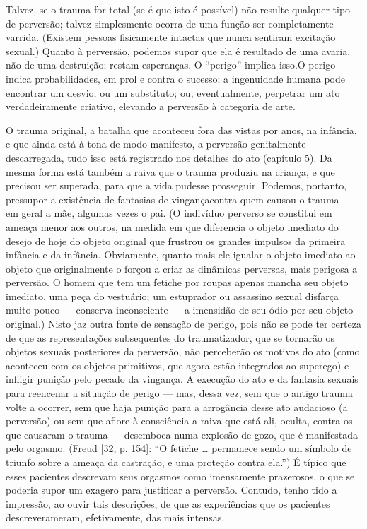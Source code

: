 Talvez, se o trauma for total (se é que isto é possível) não resulte
qualquer tipo de perversão; talvez simplesmente ocorra de uma função
ser completamente varrida. (Existem pessoas fisicamente intactas que
nunca sentiram excitação sexual.) Quanto à perversão, podemos supor que
ela é resultado de uma avaria, não de uma destruição; restam
esperanças. O ``perigo'' implica isso.\idxinfanperig[|)] O
perigo indica probabilidades, em prol e contra o sucesso; a ingenuidade
humana pode encontrar um desvio, ou um substituto; ou, eventualmente,
perpetrar um ato verdadeiramente criativo,\idxcria{} elevando a perversão à
categoria de arte.

O trauma original, a batalha que aconteceu fora das vistas por anos,
na infância, e que ainda está à tona de modo manifesto, a perversão
genitalmente descarregada, tudo isso está registrado nos detalhes do
ato (capítulo 5). Da mesma forma está também a raiva que o trauma
produziu na criança, e que precisou ser superada, para que a vida
pudesse prosseguir. Podemos, portanto, pressupor a existência de
fantasias de vingança\idxvinga[|(] contra quem causou o trauma --- em geral a mãe,
algumas vezes o pai. (O indivíduo perverso se constitui em ameaça menor
aos outros, na medida em que diferencia o objeto imediato do desejo de
hoje do objeto original que frustrou os grandes impulsos da
primeira infância e da infância. Obviamente, quanto mais ele igualar o
objeto imediato ao objeto que originalmente o forçou a criar as
dinâmicas perversas, mais perigosa a perversão. O homem que tem um
fetiche\idxfetic{} por roupas apenas mancha seu objeto imediato, uma peça do
vestuário; um estuprador\idxestup{} ou assassino\idxassas{} sexual disfarça muito pouco ---
conserva inconsciente --- a imensidão de seu ódio por seu objeto
original.) Nisto jaz outra fonte de sensação de perigo, pois não se
pode ter certeza de que as representações subsequentes do
traumatizador, que se tornarão os objetos sexuais posteriores da
perversão, não perceberão os motivos do ato (como aconteceu com os
objetos primitivos, que agora estão integrados ao superego) e infligir
punição pelo pecado da vingança. A execução do ato e da fantasia
sexuais para reencenar a situação de perigo --- mas, dessa vez, sem
que o antigo trauma volte a ocorrer, sem que haja punição para a
arrogância desse ato audacioso (a perversão) ou sem que aflore à
consciência a raiva que está ali, oculta, contra os que causaram o
trauma --- desemboca numa explosão de gozo,\idxorgasfet{} que é manifestada pelo\idxfeticorga{}
orgasmo. (Freud [32, p. 154]: ``O fetiche \ldots{} permanece
sendo um símbolo de triunfo sobre a ameaça da castração,\idxcasta{} e uma proteção
contra ela.'')\idxfreudfetic{} É típico que esses pacientes descrevam seus
orgasmos como imensamente prazerosos, o que se poderia supor um exagero
para justificar a perversão. Contudo, tenho tido a impressão, ao ouvir
tais descrições, de que as experiências que os pacientes descreveram\idxtrauma[|)]
eram, efetivamente, das mais intensas.

